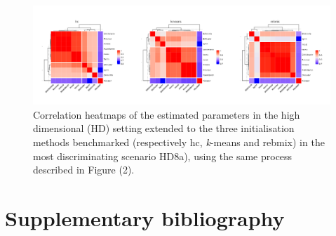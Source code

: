 \begin{figure}

{\centering \includegraphics[width=0.8\linewidth]{./figs/HD/heatmap_global_HD} 

}

\caption{Correlation heatmaps of the estimated parameters in the high dimensional (HD) setting extended to the three initialisation methods benchmarked (respectively hc, \textit{k}-means and rebmix) in the most discriminating scenario HD8a), using the same process described in Figure (2).}\label{fig:heatmap-all-correlation-plots-HD}
\end{figure}

\newpage

\hypertarget{supplementary-bibliography}{%
\section{Supplementary bibliography}\label{supplementary-bibliography}}

